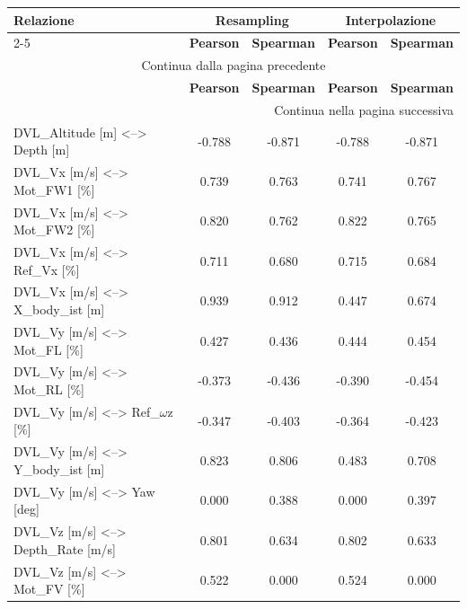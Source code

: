 \begingroup

    \footnotesize
    \keepXColumns
    \renewcommand{\arraystretch}{1.4}
    \begin{tabularx}{\textwidth}{|X | cc | cc |}
        \caption{Presentazione coefficienti di correlazione medi significativi}
        \label{tab:analisi_correlazione} \\\hline

        \textbf{Relazione} & \multicolumn{2}{c|}{\textbf{Resampling}} & \multicolumn{2}{c|}{\textbf{Interpolazione}} \\
        \cline{2-5}
        & \textbf{Pearson} & \textbf{Spearman} & \textbf{Pearson} & \textbf{Spearman} \\
        \hline
        \endfirsthead
        \multicolumn{5}{|c|}{{Continua dalla pagina precedente}} \\
        \hline
        & \textbf{Pearson} & \textbf{Spearman} & \textbf{Pearson} & \textbf{Spearman} \\
        \hline
        \endhead
        \hline \multicolumn{5}{|r|}{{Continua nella pagina successiva}} \\ \hline
        \endfoot
        \hline \endlastfoot
        DVL\_Altitude [m] <--> Depth [m] & -0.788 & -0.871 & -0.788 & -0.871 \\
        DVL\_Vx [m/s] <--> Mot\_FW1 [\%] & 0.739 & 0.763 & 0.741 & 0.767 \\
        DVL\_Vx [m/s] <--> Mot\_FW2 [\%] & 0.820 & 0.762 & 0.822 & 0.765 \\
        DVL\_Vx [m/s] <--> Ref\_Vx [\%] & 0.711 & 0.680 & 0.715 & 0.684 \\
        DVL\_Vx [m/s] <--> X\_body\_ist [m] & 0.939 & 0.912 & 0.447 & 0.674 \\
        DVL\_Vy [m/s] <--> Mot\_FL [\%] & 0.427 & 0.436 & 0.444 & 0.454 \\
        DVL\_Vy [m/s] <--> Mot\_RL [\%] & -0.373 & -0.436 & -0.390 & -0.454 \\
        DVL\_Vy [m/s] <--> Ref\_$\omega$z [\%] & -0.347 & -0.403 & -0.364 & -0.423 \\
        DVL\_Vy [m/s] <--> Y\_body\_ist [m] & 0.823 & 0.806 & 0.483 & 0.708 \\
        DVL\_Vy [m/s] <--> Yaw [deg] & 0.000 & 0.388 & 0.000 & 0.397 \\
        DVL\_Vz [m/s] <--> Depth\_Rate [m/s] & 0.801 & 0.634 & 0.802 & 0.633 \\
        DVL\_Vz [m/s] <--> Mot\_FV [\%] & 0.522 & 0.000 & 0.524 & 0.000 \\

\end{tabularx}
